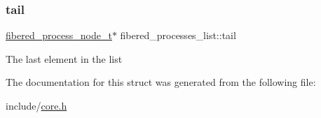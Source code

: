 \subsubsection{\texorpdfstring{tail}{tail}}
{\footnotesize\ttfamily \mbox{\hyperlink{core_8h_aa16708c717e33e5e95614cd1e4ca7b2b}{fibered\+\_\+process\+\_\+node\+\_\+t}}$\ast$ fibered\+\_\+processes\+\_\+list\+::tail}

The last element in the list 

The documentation for this struct was generated from the following file\+:\begin{DoxyCompactItemize}
\item 
include/\mbox{\hyperlink{core_8h}{core.\+h}}\end{DoxyCompactItemize}
